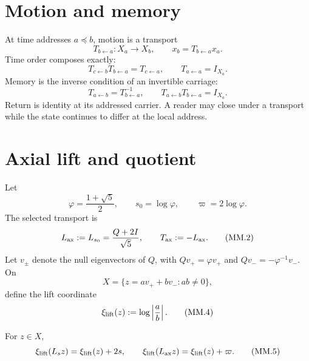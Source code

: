 \documentclass[10pt]{article}
\begin{document}

\begin{abstract}
Motion carries a physical state between time addresses. Memory is the inverse
condition by which a relation returns to its own address while the carriage
remains ordered. The axial metric flow advances a real coordinate by
$2\log\varphi$ and closes its quotient reading after that advance. The mirror
reverses the flow. Curvature records loop transport; material memory records
state update and readout. The equations distinguish a changing carrier state,
a returning read, and an ordered occurrence without erasing their difference.
\end{abstract}

\section{Motion and memory}

At time addresses $a\preceq b$, motion is a transport
\[
T_{b\leftarrow a}:X_a\longrightarrow X_b,
\qquad x_b=T_{b\leftarrow a}x_a.
\tag{MM.0}
\]
Time order composes exactly:
\[
T_{c\leftarrow b}T_{b\leftarrow a}=T_{c\leftarrow a},
\qquad T_{a\leftarrow a}=I_{X_a}.
\tag{MM.0a}
\]
Memory is the inverse condition of an invertible carriage:
\[
T_{a\leftarrow b}=T_{b\leftarrow a}^{-1},
\qquad T_{a\leftarrow b}T_{b\leftarrow a}=I_{X_a}.
\tag{MM.0b}
\]
Return is identity at its addressed carrier. A reader may close under a
transport while the state continues to differ at the local address.

\section{Axial lift and quotient}

\sharedroot

Let
\[
\varphi=\frac{1+\sqrt5}{2},\qquad
s_0=\log\varphi,\qquad
\varpi=2\log\varphi.
\tag{MM.1}
\]
The selected transport is
\[
L_{\rm ax}:=L_{s_0}=\frac{Q+2I}{\sqrt5},
\qquad T_{\rm ax}:=-L_{\rm ax}.
\tag{MM.2}
\]
Let $v_\pm$ denote the null eigenvectors of $Q$, with
$Qv_+=\varphi v_+$ and $Qv_-=-\varphi^{-1}v_-$. On
\[
X=\{z=av_++bv_-:ab\ne0\},
\tag{MM.3}
\]
define the lift coordinate
\[
\xi_{\rm lift}(z):=\log\left|\frac ab\right|.
\tag{MM.4}
\]

\begin{proposition}
For $z\in X$,
\[
\xi_{\rm lift}(L_s z)=\xi_{\rm lift}(z)+2s,
\qquad
\xi_{\rm lift}(L_{\rm ax}z)=\xi_{\rm lift}(z)+\varpi.
\tag{MM.5}
\]
\end{proposition}
\end{document}
